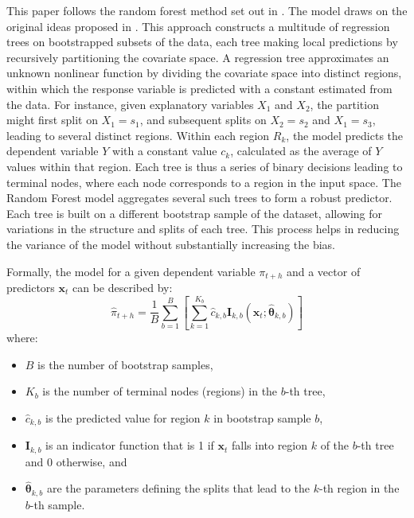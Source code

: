 

This paper follows the random forest method set out in \textcite{Medeiros2021ForecastingMethods}. The model draws on the original ideas proposed in \textcite{Breiman2001RandomForests}. This approach constructs a multitude of regression trees on bootstrapped subsets of the data, each tree making local predictions by recursively partitioning the covariate space. A regression tree approximates an unknown nonlinear function by dividing the covariate space into distinct regions, within which the response variable is predicted with a constant estimated from the data. For instance, given explanatory variables $X_1$ and $X_2$, the partition might first split on $X_1=s_1$, and subsequent splits on $X_2=s_2$ and $X_1=s_3$, leading to several distinct regions. Within each region $R_k$, the model predicts the dependent variable $Y$ with a constant value $c_k$, calculated as the average of $Y$ values within that region. Each tree is thus a series of binary decisions leading to terminal nodes, where each node corresponds to a region in the input space. The Random Forest model aggregates several such trees to form a robust predictor. Each tree is built on a different bootstrap sample of the dataset, allowing for variations in the structure and splits of each tree. This process helps in reducing the variance of the model without substantially increasing the bias.

Formally, the model for a given dependent variable $\pi_{t+h}$ and a vector of predictors $\boldsymbol{x}_t$ can be described by:
$$
\widehat{\pi}_{t+h} = \frac{1}{B} \sum_{b=1}^B \left[ \sum_{k=1}^{K_b} \widehat{c}_{k, b} \mathbf{I}_{k, b}\left(\boldsymbol{x}_t ; \widehat{\boldsymbol{\theta}}_{k, b}\right) \right]
$$
where:
\begin{itemize}
    \item $B$ is the number of bootstrap samples,
    \item $K_b$ is the number of terminal nodes (regions) in the $b$-th tree,
    \item $\widehat{c}_{k, b}$ is the predicted value for region $k$ in bootstrap sample $b$,
    \item $\mathbf{I}_{k, b}$ is an indicator function that is 1 if $\boldsymbol{x}_t$ falls into region $k$ of the $b$-th tree and 0 otherwise, and
    \item $\widehat{\boldsymbol{\theta}}_{k, b}$ are the parameters defining the splits that lead to the $k$-th region in the $b$-th sample.
\end{itemize}

